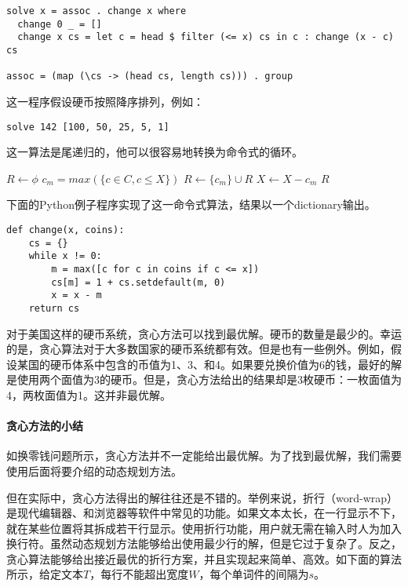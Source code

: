 \documentclass[UTF8]{article}
\begin{document}
\lstset{language=Haskell}
\begin{lstlisting}
solve x = assoc . change x where
  change 0 _ = []
  change x cs = let c = head $ filter (<= x) cs in c : change (x - c) cs

assoc = (map (\cs -> (head cs, length cs))) . group
\end{lstlisting} %

这一程序假设硬币按照降序排列，例如：

\lstset{language=Haskell}
\begin{lstlisting}
solve 142 [100, 50, 25, 5, 1]
\end{lstlisting}

这一算法是尾递归的，他可以很容易地转换为命令式的循环。

\begin{algorithmic}[1]
  \State $R \gets \phi$
    \State $c_m = max(\{c \in C, c \leq X\})$
    \State $R \gets \{c_m\} \cup R$
    \State $X \gets X - c_m$
  \EndWhile
  \State \Return $R$
\EndFunction
\end{algorithmic}

下面的Python例子程序实现了这一命令式算法，结果以一个dictionary输出。

\lstset{language=Python}
\begin{lstlisting}
def change(x, coins):
    cs = {}
    while x != 0:
        m = max([c for c in coins if c <= x])
        cs[m] = 1 + cs.setdefault(m, 0)
        x = x - m
    return cs
\end{lstlisting}

对于美国这样的硬币系统，贪心方法可以找到最优解。硬币的数量是最少的。幸运的是，贪心算法对于大多数国家的硬币系统都有效。但是也有一些例外。例如，假设某国的硬币体系中包含的币值为1、3、和4。如果要兑换价值为6的钱，最好的解是使用两个面值为3的硬币。但是，贪心方法给出的结果却是3枚硬币：一枚面值为4，两枚面值为1。这并非最优解。

\paragraph{贪心方法的小结}

如换零钱问题所示，贪心方法并不一定能给出最优解。为了找到最优解，我们需要使用后面将要介绍的动态规划方法。

但在实际中，贪心方法得出的解往往还是不错的。举例来说，折行（word-wrap）是现代编辑器、和浏览器等软件中常见的功能。如果文本太长，在一行显示不下，就在某些位置将其拆成若干行显示。使用折行功能，用户就无需在输入时人为加入换行符。虽然动态规划方法能够给出使用最少行的解，但是它过于复杂了。反之，贪心算法能够给出接近最优的折行方案，并且实现起来简单、高效。如下面的算法所示，给定文本$T$，每行不能超出宽度$W$，每个单词件的间隔为$s$。
\end{document}
